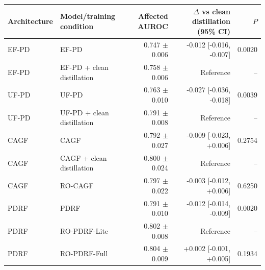 \begin{tabular}{llrrr}
\toprule
Architecture & Model/training condition & Affected AUROC & $\Delta$ vs clean distillation (95\% CI) & $P$ \\
\midrule
EF-PD & EF-PD & 0.747 $\pm$ 0.006 & -0.012 [-0.016, -0.007] & 0.0020 \\
EF-PD & EF-PD + clean distillation & 0.758 $\pm$ 0.006 & Reference & -- \\
UF-PD & UF-PD & 0.763 $\pm$ 0.010 & -0.027 [-0.036, -0.018] & 0.0039 \\
UF-PD & UF-PD + clean distillation & 0.791 $\pm$ 0.008 & Reference & -- \\
CAGF & CAGF & 0.792 $\pm$ 0.027 & -0.009 [-0.023, +0.006] & 0.2754 \\
CAGF & CAGF + clean distillation & 0.800 $\pm$ 0.024 & Reference & -- \\
CAGF & RO-CAGF & 0.797 $\pm$ 0.022 & -0.003 [-0.012, +0.006] & 0.6250 \\
PDRF & PDRF & 0.791 $\pm$ 0.010 & -0.012 [-0.014, -0.009] & 0.0020 \\
PDRF & RO-PDRF-Lite & 0.802 $\pm$ 0.008 & Reference & -- \\
PDRF & RO-PDRF-Full & 0.804 $\pm$ 0.009 & +0.002 [-0.001, +0.005] & 0.1934 \\
\bottomrule
\end{tabular}